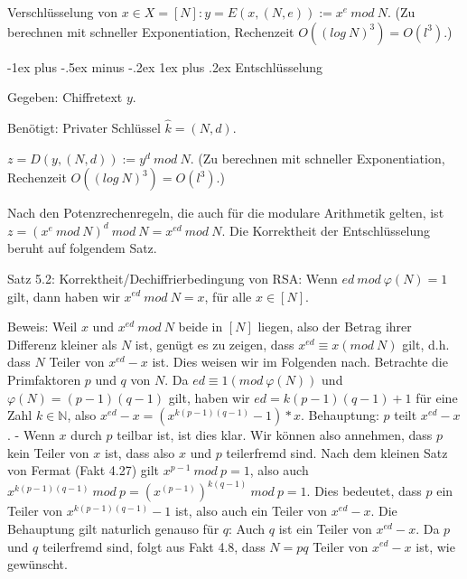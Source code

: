 \documentclass[a4paper]{article}
\makeatletter
\renewcommand{\subsubsection}{\@startsection{subsubsection}{3}{0mm}%
 {-1ex plus -.5ex minus -.2ex}%
 {1ex plus .2ex}%
 {\normalfont\small\bfseries}}
\makeatother
\begin{document}
\begin{multicols}{3}
        Verschlüsselung von $x\in X= [N]: y=E(x,(N,e)) :=x^e\ mod\ N$. (Zu berechnen mit schneller Exponentiation, Rechenzeit $O((log\ N)^3) =O(l^3)$.)

        \subsubsection{Entschlüsselung}
        \begin{itemize*}
            \item Gegeben: Chiffretext $y$.
            \item Benötigt: Privater Schlüssel $\hat{k}= (N,d)$.
        \end{itemize*}

        $z=D(y,(N,d)) :=y^d\ mod\ N$. (Zu berechnen mit schneller Exponentiation, Rechenzeit $O((log\ N)^3) =O(l^3)$.)

        Nach den Potenzrechenregeln, die auch für die modulare Arithmetik gelten, ist $z=(x^e\ mod\ N)^d\ mod\ N=x^{ed}\ mod\ N$. Die Korrektheit der Entschlüsselung beruht auf folgendem Satz.

        Satz 5.2: Korrektheit/Dechiffrierbedingung von RSA: Wenn $ed\ mod\ \varphi(N) = 1$ gilt, dann haben wir $x^{ed}\ mod\ N=x$, für alle $x\in [N]$.

        Beweis: Weil $x$ und $x^{ed}\ mod\ N$ beide in $[N]$ liegen, also der Betrag ihrer Differenz kleiner als $N$ ist, genügt es zu zeigen, dass $x^{ed} \equiv x(mod\ N)$ gilt, d.h. dass $N$ Teiler von $x^{ed}-x$ ist.
        Dies weisen wir im Folgenden nach. Betrachte die Primfaktoren $p$ und $q$ von $N$. Da $ed\equiv 1 (mod\ \varphi(N))$ und $\varphi(N) = (p-1)(q-1)$ gilt, haben wir $ed=k(p-1)(q-1) + 1$ für eine Zahl $k\in\mathbb{N}$, also $x^{ed}-x= (x^{k(p-1)(q-1)} -1)*x$.
        Behauptung: $p$ teilt $x^{ed}-x$. - Wenn $x$ durch $p$ teilbar ist, ist dies klar. Wir können also annehmen, dass $p$ kein Teiler von $x$ ist, dass also $x$ und $p$ teilerfremd sind. Nach dem kleinen Satz von Fermat (Fakt 4.27) gilt $x^{p-1}\ mod\ p= 1$, also auch $x^{k(p-1)(q-1)}\ mod\ p= (x^{(p-1)})^{k(q-1)}\ mod\ p= 1$.
        Dies bedeutet, dass $p$ ein Teiler von $x^{k(p-1)(q-1)}-1$ ist, also auch ein Teiler von $x^{ed}-x$.
        Die Behauptung gilt naturlich genauso für $q$: Auch $q$ ist ein Teiler von $x^{ed}-x$. Da $p$ und $q$ teilerfremd sind, folgt aus Fakt 4.8, dass $N=pq$ Teiler von $x^{ed}-x$ ist, wie gewünscht.


\end{multicols}
\end{document}
